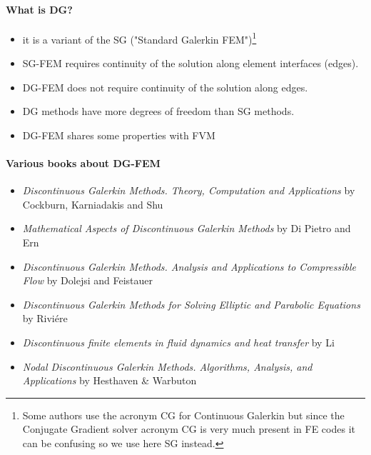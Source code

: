 
\paragraph{What is DG?}

\begin{itemize}
\item it is a variant of the SG ("Standard Galerkin FEM")\footnote{Some authors use the acronym 
CG for Continuous Galerkin but since the Conjugate Gradient solver acronym CG is very much present in FE codes it can 
be confusing so we use here SG instead.}
\item SG-FEM requires continuity of the solution along element interfaces (edges).
\item DG-FEM does not require continuity of the solution along edges.
\item DG methods have more degrees of freedom than SG methods.
\item DG-FEM shares some properties with FVM
\end{itemize}

\paragraph{Various books about DG-FEM}

\begin{itemize}
\item {\it Discontinuous Galerkin Methods. Theory, Computation and Applications} by
Cockburn, Karniadakis and Shu \cite{cockburn00}
\item {\it Mathematical Aspects of Discontinuous Galerkin Methods} by Di Pietro and Ern 
\cite{dipietro_ern12}
\item {\it Discontinuous Galerkin Methods. Analysis and Applications to Compressible Flow} by 
Dolejsi and Feistauer \cite{dolejsi_feistauer15}
\item {\it Discontinuous Galerkin Methods for Solving Elliptic and Parabolic Equations} by Rivi{\'e}re
\cite{riviere08}
\item {\it Discontinuous finite elements in fluid dynamics and heat transfer} by Li \cite{li06}
\item {\it Nodal Discontinuous Galerkin Methods. Algorithms, Analysis, and Applications} by 
Hesthaven \& Warbuton \cite{hewa08}
\end{itemize}

